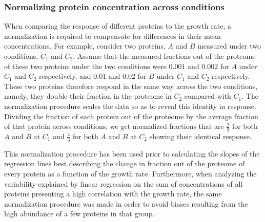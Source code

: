 \subsubsection{Normalizing protein concentration across conditions}
\label{concacrossconds} 

When comparing the response of different proteins to the growth rate, a normalization is required to compensate for differences in their mean concentrations.
For example, consider two proteins, $A$ and $B$ measured under two conditions, $C_1$ and $C_2$.
Assume that the measured fractions out of the proteome of these two proteins under the two conditions were $0.001$ and $0.002$ for $A$ under $C_1$ and $C_2$ respectively, and $0.01$ and $0.02$ for $B$ under $C_1$ and $C_2$ respectively.
These two proteins therefore respond in the same way across the two conditions, namely, they double their fraction in the proteome in $C_2$ compared with $C_1$.
The normalization procedure scales the data so as to reveal this identity in response.
Dividing the fraction of each protein out of the proteome by the average fraction of that protein across conditions, we get normalized fractions that are $\frac{2}{3}$ for both $A$ and $B$ at $C_1$ and $\frac{4}{3}$ for both $A$ and $B$ at $C_2$ showing their identical response.

This normalization procedure has been used prior to calculating the slopes of the regression lines best describing the change in fraction out of the proteome of every protein as a function of the growth rate.
Furthermore, when analyzing the variability explained by linear regression on the sum of concentrations of all proteins presenting a high correlation with the growth rate, the same normalization procedure was made in order to avoid biases resulting from the high abundance of a few proteins in that group.